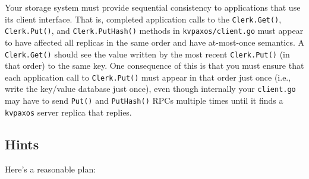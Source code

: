 \documentclass{article}
\newcommand{\code}{\texttt}
\begin{document}
Your storage system must provide sequential consistency to
applications that use its client interface. That is, completed application
calls to the \code{Clerk.Get()}, \code{Clerk.Put()}, and \code{Clerk.PutHash()} methods in
\code{kvpaxos/client.go} must appear to have affected all replicas in the same
order and have at-most-once semantics. A \code{Clerk.Get()} should see the value written by the
most recent \code{Clerk.Put()} (in that order) to the same
key. One consequence of this is that you must ensure that each
application call to \code{Clerk.Put()} must appear in that order just once (i.e.,
write the key/value database just once), even though internally your
\code{client.go} may have to send \code{Put()} and \code{PutHash()} RPCs multiple times
until it finds a \code{kvpaxos} server replica that replies.

\subsection{Hints}
Here's a reasonable plan:
\end{document}
